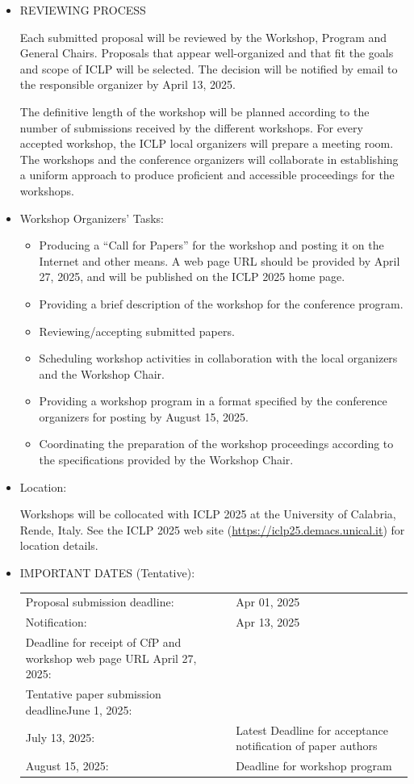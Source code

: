 \documentclass[prodmode,acmtecs]{acmsmall} %
\begin{document}
\begin{itemize}
\item  REVIEWING PROCESS   
 
  Each submitted proposal will be reviewed by the Workshop, Program and General Chairs. Proposals that appear well-organized and that fit the goals and scope of ICLP will be selected. The decision will be notified by email to the responsible organizer by April 13, 2025. 
 
  The definitive length of the workshop will be planned according to the number of submissions received by the different workshops. For every accepted workshop, the ICLP local organizers will prepare a meeting room. The workshops and the conference organizers will collaborate in establishing a uniform approach to produce proficient and accessible proceedings for the workshops. 
 
\item  Workshop Organizers' Tasks: 
 
\begin{itemize}\item  Producing a ``Call for Papers'' for the workshop and posting it on the Internet and other means. A web page URL should be provided by April 27, 2025, and will be published on the ICLP 2025 home page.
\item  Providing a brief description of the workshop for the conference program.
\item  Reviewing/accepting submitted papers.
\item  Scheduling workshop activities in collaboration with the local organizers and the Workshop Chair.
\item  Providing a workshop program in a format specified by the conference organizers for posting by August 15, 2025.
\item  Coordinating the preparation of the workshop proceedings according to the specifications provided by the Workshop Chair.
\end{itemize} 
\item  Location: 
 
  Workshops will be collocated with ICLP 2025 at the University of Calabria, Rende, Italy. See the ICLP 2025 web site (\href{https://iclp25.demacs.unical.it}{https://iclp25.demacs.unical.it}) for location details. 
 
\item  IMPORTANT DATES (Tentative): 
 
\begin{tabulary}{\linewidth}{LL}Proposal submission deadline:  & Apr 01, 2025 \\
Notification:  & Apr 13, 2025 \\
Deadline for receipt of CfP and workshop web page URL April 27, 2025:  &  \\
Tentative paper submission deadlineJune 1, 2025:  &  \\
July 13, 2025:  & Latest Deadline for acceptance notification of paper authors \\
August 15, 2025:  & Deadline for workshop program \\
\end{tabulary}
 

\end{itemize}
\end{document}
